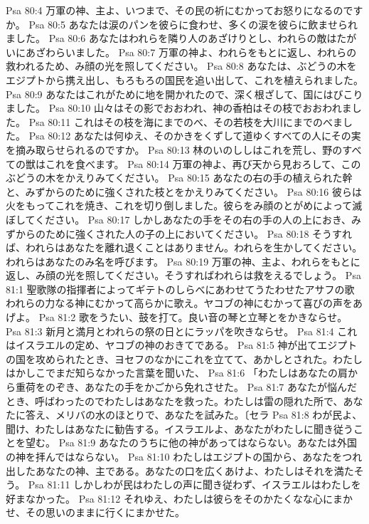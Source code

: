 Psa 80:4  万軍の神、主よ、いつまで、その民の祈にむかってお怒りになるのですか。
Psa 80:5  あなたは涙のパンを彼らに食わせ、多くの涙を彼らに飲ませられました。
Psa 80:6  あなたはわれらを隣り人のあざけりとし、われらの敵はたがいにあざわらいました。
Psa 80:7  万軍の神よ、われらをもとに返し、われらの救われるため、み顔の光を照してください。
Psa 80:8  あなたは、ぶどうの木をエジプトから携え出し、もろもろの国民を追い出して、これを植えられました。
Psa 80:9  あなたはこれがために地を開かれたので、深く根ざして、国にはびこりました。
Psa 80:10  山々はその影でおおわれ、神の香柏はその枝でおおわれました。
Psa 80:11  これはその枝を海にまでのべ、その若枝を大川にまでのべました。
Psa 80:12  あなたは何ゆえ、そのかきをくずして道ゆくすべての人にその実を摘み取らせられるのですか。
Psa 80:13  林のいのししはこれを荒し、野のすべての獣はこれを食べます。
Psa 80:14  万軍の神よ、再び天から見おろして、このぶどうの木をかえりみてください。
Psa 80:15  あなたの右の手の植えられた幹と、みずからのために強くされた枝とをかえりみてください。
Psa 80:16  彼らは火をもってこれを焼き、これを切り倒しました。彼らをみ顔のとがめによって滅ぼしてください。
Psa 80:17  しかしあなたの手をその右の手の人の上におき、みずからのために強くされた人の子の上においてください。
Psa 80:18  そうすれば、われらはあなたを離れ退くことはありません。われらを生かしてください。われらはあなたのみ名を呼びます。
Psa 80:19  万軍の神、主よ、われらをもとに返し、み顔の光を照してください。そうすればわれらは救をえるでしょう。
Psa 81:1  聖歌隊の指揮者によってギテトのしらべにあわせてうたわせたアサフの歌 われらの力なる神にむかって高らかに歌え。ヤコブの神にむかって喜びの声をあげよ。
Psa 81:2  歌をうたい、鼓を打て。良い音の琴と立琴とをかきならせ。
Psa 81:3  新月と満月とわれらの祭の日とにラッパを吹きならせ。
Psa 81:4  これはイスラエルの定め、ヤコブの神のおきてである。
Psa 81:5  神が出てエジプトの国を攻められたとき、ヨセフのなかにこれを立てて、あかしとされた。わたしはかしこでまだ知らなかった言葉を聞いた、
Psa 81:6  「わたしはあなたの肩から重荷をのぞき、あなたの手をかごから免れさせた。
Psa 81:7  あなたが悩んだとき、呼ばわったのでわたしはあなたを救った。わたしは雷の隠れた所で、あなたに答え、メリバの水のほとりで、あなたを試みた。〔セラ
Psa 81:8  わが民よ、聞け、わたしはあなたに勧告する。イスラエルよ、あなたがわたしに聞き従うことを望む。
Psa 81:9  あなたのうちに他の神があってはならない。あなたは外国の神を拝んではならない。
Psa 81:10  わたしはエジプトの国から、あなたをつれ出したあなたの神、主である。あなたの口を広くあけよ、わたしはそれを満たそう。
Psa 81:11  しかしわが民はわたしの声に聞き従わず、イスラエルはわたしを好まなかった。
Psa 81:12  それゆえ、わたしは彼らをそのかたくなな心にまかせ、その思いのままに行くにまかせた。
